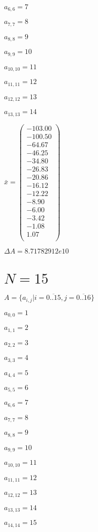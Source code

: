 \documentclass[a4paper,12pt]{article}
\begin{document}
$a _{ 6, 6 } = 7$

$a _{ 7, 7 } = 8$

$a _{ 8, 8 } = 9$

$a _{ 9, 9 } = 10$

$a _{ 10, 10 } = 11$

$a _{ 11, 11 } = 12$

$a _{ 12, 12 } = 13$

$a _{ 13, 13 } = 14$

$\bar { x } = \begin{pmatrix}
-103.00 \\
-100.50 \\
-64.67 \\
-46.25 \\
-34.80 \\
-26.83 \\
-20.86 \\
-16.12 \\
-12.22 \\
-8.90 \\
-6.00 \\
-3.42 \\
-1.08 \\
1.07 \\
\end{pmatrix}
$

$\Delta A = 8.71782912e10$



\section{ $N = 15$ }
$A = \{ a _{ i, j } | i = \overline { 0..15 }, j = \overline { 0..16 } \}$

$a _{ 0, 0 } = 1$

$a _{ 1, 1 } = 2$

$a _{ 2, 2 } = 3$

$a _{ 3, 3 } = 4$

$a _{ 4, 4 } = 5$

$a _{ 5, 5 } = 6$

$a _{ 6, 6 } = 7$

$a _{ 7, 7 } = 8$

$a _{ 8, 8 } = 9$

$a _{ 9, 9 } = 10$

$a _{ 10, 10 } = 11$

$a _{ 11, 11 } = 12$

$a _{ 12, 12 } = 13$

$a _{ 13, 13 } = 14$

$a _{ 14, 14 } = 15$
\end{document}
